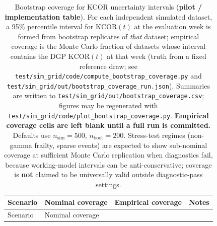 \documentclass[
]{article}
\begin{document}
\begin{longtable}[]{@{}
  >{\raggedright\arraybackslash}p{}
  >{\raggedright\arraybackslash}p{}
  >{\raggedright\arraybackslash}p{}
  >{\raggedright\arraybackslash}p{}@{}}
\caption{Bootstrap coverage for KCOR uncertainty intervals (\textbf{pilot /
implementation table}). For each independent simulated dataset, a 95\%
percentile interval for $\mathrm{KCOR}(t)$ at the evaluation week is formed
from bootstrap replicates of \emph{that} dataset; empirical coverage is the
Monte Carlo fraction of datasets whose interval contains the DGP
$\mathrm{KCOR}(t)$ at that week (truth from a fixed reference draw; see
\texttt{test/sim\_grid/code/compute\_bootstrap\_coverage.py} and
\texttt{test/sim\_grid/out/bootstrap\_coverage\_run.json}). Summaries are
written to \texttt{test/sim\_grid/out/bootstrap\_coverage.csv}; figures may be
regenerated with \texttt{test/sim\_grid/code/plot\_bootstrap\_coverage.py}.
\textbf{Empirical coverage cells are left blank until a full run is
committed.} Defaults use $n_{\mathrm{sim}}=500$, $n_{\mathrm{boot}}=200$.
Stress-test regimes (non-gamma frailty, sparse events) are expected to show
sub-nominal coverage at sufficient Monte Carlo replication when diagnostics
fail, because working-model intervals can be anti-conservative; coverage is
\textbf{not} claimed to be universally valid outside diagnostic-pass
settings.}\label{tbl:bootstrap_coverage}\tabularnewline
\toprule\noalign{}
\begin{minipage}[b]{\linewidth}\raggedright
Scenario
\end{minipage} & \begin{minipage}[b]{\linewidth}\raggedright
Nominal coverage
\end{minipage} & \begin{minipage}[b]{\linewidth}\raggedright
Empirical coverage
\end{minipage} & \begin{minipage}[b]{\linewidth}\raggedright
Notes
\end{minipage} \\
\midrule\noalign{}
\endfirsthead
\toprule\noalign{}
\begin{minipage}[b]{\linewidth}\raggedright
Scenario
\end{minipage} & \begin{minipage}[b]{\linewidth}\raggedright
Nominal coverage
\end{minipage} & \begin{minipage}[b]{\linewidth}\raggedright

\end{minipage}
\end{longtable}
\end{document}
